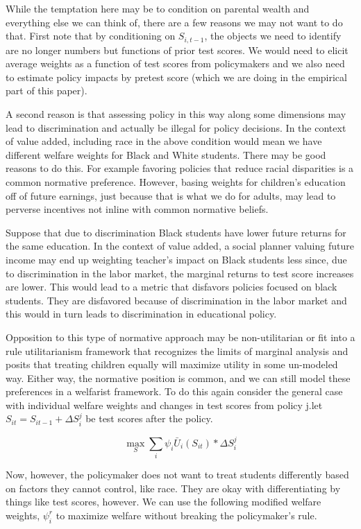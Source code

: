 \documentclass{article}
\theoremstyle{definition}
\theoremstyle{definition}
\theoremstyle{definition}
\begin{document}
While the temptation here may be to condition on parental wealth and everything else we can think of, there are a few reasons we may not want to do that. First note that by conditioning on $S_{i,t-1}$, the objects we need to identify are no longer numbers but functions of prior test scores. We would need to elicit average weights as a function of test scores from policymakers and we also need to estimate policy impacts by pretest score (which we are doing in the empirical part of this paper). 

A second reason is that assessing policy in this way along some dimensions may lead to discrimination and actually be illegal for policy decisions. In the context of value added, including race in the above condition would mean we have different welfare weights for Black and White students. There may be good reasons to do this. For example favoring policies that reduce racial disparities is a common normative preference. However, basing weights for children's education off of future earnings, just because that is what we do for adults, may lead to perverse incentives not inline with common normative beliefs.   

Suppose that due to discrimination Black students have lower future returns for the same education. In the context of value added, a social planner valuing future income may end up weighting teacher's impact on Black students less since, due to discrimination in the labor market, the marginal returns to test score increases are lower. This would lead to a metric that disfavors policies focused on black students. They are disfavored because of discrimination in the labor market and this would in turn leads to discrimination in educational policy. 

Opposition to this type of normative approach may be non-utilitarian or fit into a rule utilitarianism framework that recognizes the limits of marginal analysis and posits that treating children equally will maximize utility in some un-modeled way. Either way, the normative position is common, and we can still model these preferences in a welfarist framework. To do this again consider the general case with individual welfare weights and changes in test scores from policy j.let $ S_{it} = S_{it-1} + \Delta S_i^j$ be test scores after the policy. 

\begin{equation}
 \max_S \sum_i \psi_i \bar{U}_{i}(S_{it}) * \Delta S_i^j
\end{equation}

Now, however, the policymaker does not want to treat students differently based on factors they cannot control, like race. They are okay with differentiating by things like test scores, however. We can use the following modified welfare weights, $\psi_i^r$ to maximize welfare without breaking the policymaker's rule. 
\end{document}
